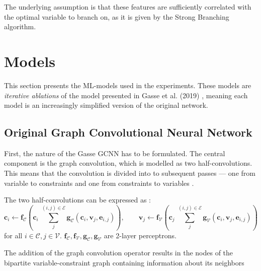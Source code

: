 %


The underlying assumption is that these features are sufficiently correlated with the optimal variable to branch on, as it is given by the Strong Branching algorithm.



\section{Models}\label{sec:models}

This section presents the \gls{ML}-models used in the experiments. These models are \textit{iterative ablations} of the model presented in Gasse et al. (2019) \cite{gasse2019exact}, meaning each model is an increasingly simplified version of the original network. 


\subsection{Original Graph Convolutional Neural Network}\label{ssec:models_gcnn}

First, the nature of the Gasse GCNN has to be formulated. The central component is the graph convolution, which is modelled as two half-convolutions. This means that the convolution is divided into to subsequent passes --- one from variable to constraints and one from constraints to variables \cite{gasse2019exact}. 

The two half-convolutions can be expressed as \cite{gasse2019exact}:
\begin{equation}
    \mathbf{c}_i \leftarrow \mathbf{f}_{\mathcal{C}}\left( \mathbf{c}_i \; \sum_j^{(i,j) \in \mathcal{E}}\mathbf{g}_{\mathcal{C}} (\mathbf{c}_i, \mathbf{v}_j, \mathbf{e}_{i,j})\right), \qquad
    \mathbf{v}_j \leftarrow \mathbf{f}_{\mathcal{V}}\left( \mathbf{c}_j \; \sum_j^{(i,j) \in \mathcal{E}}\mathbf{g}_{\mathcal{V}} (\mathbf{c}_i, \mathbf{v}_j, \mathbf{e}_{i,j})\right)
\end{equation}
for all $i \in \mathcal{C}, j \in \mathcal{V}$. $\mathbf{f}_{\mathcal{C}},\mathbf{f}_{\mathcal{V}},\mathbf{g}_{\mathcal{C}},\mathbf{g}_{\mathcal{V}}$ are 2-layer perceptrons. 

The addition of the graph convolution operator results in the nodes of the bipartite variable-constraint graph containing information about its neighbors 

